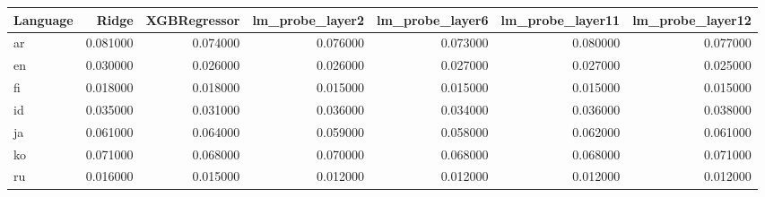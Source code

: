 \begin{tabular}{lrrrrrr}
\toprule
Language & Ridge & XGBRegressor & lm_probe_layer2 & lm_probe_layer6 & lm_probe_layer11 & lm_probe_layer12 \\
\midrule
ar & 0.081000 & 0.074000 & 0.076000 & 0.073000 & 0.080000 & 0.077000 \\
en & 0.030000 & 0.026000 & 0.026000 & 0.027000 & 0.027000 & 0.025000 \\
fi & 0.018000 & 0.018000 & 0.015000 & 0.015000 & 0.015000 & 0.015000 \\
id & 0.035000 & 0.031000 & 0.036000 & 0.034000 & 0.036000 & 0.038000 \\
ja & 0.061000 & 0.064000 & 0.059000 & 0.058000 & 0.062000 & 0.061000 \\
ko & 0.071000 & 0.068000 & 0.070000 & 0.068000 & 0.068000 & 0.071000 \\
ru & 0.016000 & 0.015000 & 0.012000 & 0.012000 & 0.012000 & 0.012000 \\
\bottomrule
\end{tabular}
